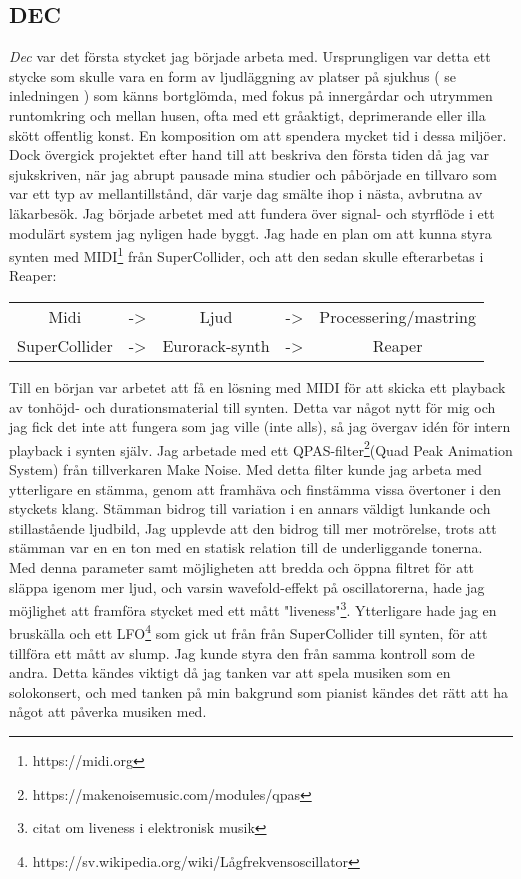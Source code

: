 \documentclass{article}
\begin{document}
\subsection{DEC}
\emph{Dec} var det första stycket jag började arbeta med. Ursprungligen var detta ett stycke som skulle
vara en form av ljudläggning av platser på sjukhus ( se inledningen ) som känns bortglömda, med fokus på
innergårdar och utrymmen runtomkring och mellan husen, ofta med ett gråaktigt, deprimerande eller illa
skött offentlig konst. En komposition om att spendera mycket tid i dessa miljöer. Dock övergick projektet
efter hand till att beskriva den första tiden då jag var sjukskriven, när jag abrupt pausade mina studier
och påbörjade en tillvaro som var ett typ av mellantillstånd, där varje dag smälte ihop i nästa, avbrutna
av läkarbesök.
Jag började arbetet med att fundera över signal- och styrflöde i ett modulärt system jag nyligen hade
byggt. Jag hade en plan om att kunna styra synten med MIDI\footnote{https://midi.org} från SuperCollider, och att
den sedan skulle efterarbetas i Reaper:
\begin{center}
	\begin{tabular}{ c c c c c }
		Midi		  & -> & Ljud			& -> & Processering/mastring \\
		SuperCollider & -> & Eurorack-synth & -> & Reaper
	\end{tabular}
\end{center}

Till en början var arbetet att få en lösning med MIDI för att skicka ett playback av tonhöjd- och
durationsmaterial till synten. Detta var något nytt för mig och jag fick det inte att fungera som jag
ville (inte alls), så jag övergav idén för intern playback i synten själv. 
Jag arbetade med ett QPAS-filter\footnote{https://makenoisemusic.com/modules/qpas}(Quad Peak Animation System) från tillverkaren Make
Noise. Med detta filter kunde jag arbeta med ytterligare en stämma, genom att
framhäva och finstämma vissa övertoner i den styckets klang. Stämman bidrog till variation i en
annars väldigt lunkande och stillastående ljudbild, Jag upplevde att den bidrog till mer motrörelse,
trots att stämman var en en ton med en statisk relation till de underliggande tonerna. Med denna
parameter samt möjligheten att bredda och öppna filtret för att släppa igenom mer ljud, och varsin
wavefold-effekt på oscillatorerna, hade jag möjlighet att framföra stycket med ett mått
"liveness"\footnote{citat om liveness i elektronisk musik}. Ytterligare hade jag en bruskälla och ett
LFO\footnote{https://sv.wikipedia.org/wiki/Lågfrekvensoscillator} som gick ut från från SuperCollider till synten, för att tillföra ett mått av slump.
Jag kunde styra den från samma kontroll som de andra. Detta kändes viktigt då jag tanken var att
spela musiken som en solokonsert, och med tanken på min bakgrund som pianist kändes det rätt att ha
något att påverka musiken med. 
\end{document}
